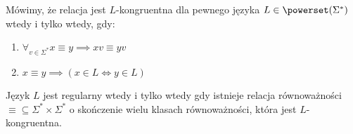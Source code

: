 \begin{definition}
    Mówimy, że relacja jest \(L\)-kongruentna dla pewnego języka \(L \in \powerset(\Sigma^*)\) wtedy i tylko wtedy, gdy:
    \begin{enumerate}
        \item \(\forall_{v \in \Sigma^*} x \equiv y \implies xv \equiv yv \)
        \item \( x \equiv y \implies (x \in L \iff y \in L)\)
    \end{enumerate}
\end{definition}


\begin{theorem}
    Język \( L \) jest regularny wtedy i tylko wtedy gdy
    istnieje relacja równoważności \( \equiv \subseteq \Sigma^* \times \Sigma^*\) o skończenie wielu klasach równoważności, która jest \(L\)-kongruentna.
\end{theorem}
